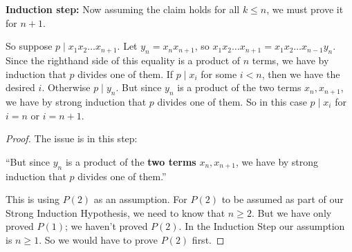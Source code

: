 \documentclass[14pt]{extarticle}
\begin{document}
{\bf Induction step:} Now assuming the claim holds for all $k \leq n$, we must prove it for $n + 1$.

So suppose $p \mid x_1 x_2 \ldots x_{n + 1}$. Let $y_n = x_n x_{n+1}$, so $x_1 x_2 \ldots x_{n+1} = x_1 x_2 \ldots x_{n-1} y_n$. Since the
righthand side of this equality is a product of $n$ terms, we have by induction that $p$ divides one of them. If $p \mid x_i$ for some $i < n$, then we have the desired $i$. Otherwise $p \mid y_n$. But since $y_n$ is a product of the two terms $x_n, x_{n+1}$, we have by strong induction that $p$ divides one of them. So in this case $p \mid x_i$ for $i = n$ or $i = n + 1$.
\begin{proof}
The issue is in this step:

``But since $y_n$ is a product of the {\bf two terms} $x_n, x_{n+1}$, we have by strong induction that $p$ divides one of them.''

This is using $P(2)$ as an assumption. For $P(2)$ to be assumed as part of our Strong Induction Hypothesis, we need to know that $n \geq 2$. But we have only proved $P(1)$; we haven't proved $P(2)$. In the Induction Step our assumption is $n \geq 1$. So we would have to prove $P(2)$ first.
\end{proof}
\end{document}
